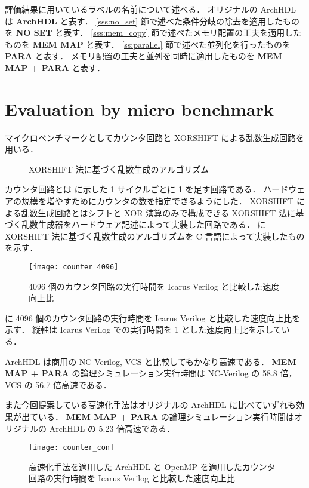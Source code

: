 評価結果に用いているラベルの名前について述べる．
オリジナルの ArchHDL は \textbf{ArchHDL} と表す．
\ref{sss:no_set} 節で述べた条件分岐の除去を適用したものを \textbf{NO SET} と表す．
\ref{sss:mem_copy} 節で述べたメモリ配置の工夫を適用したものを \textbf{MEM MAP} と表す．
\ref{ss:parallel} 節で述べた並列化を行ったものを \textbf{PARA} と表す．
メモリ配置の工夫と並列を同時に適用したものを \textbf{MEM MAP + PARA} と表す．


\section{Evaluation by micro benchmark}

マイクロベンチマークとしてカウンタ回路と XORSHIFT による乱数生成回路を用いる．

\begin{figure}[tb]
 
 \caption{XORSHIFT 法に基づく乱数生成のアルゴリズム}
 \label{src:xorshift_alg}
\end{figure}

カウンタ回路とは  に示した 1 サイクルごとに 1 を足す回路である．
ハードウェアの規模を増やすためにカウンタの数を指定できるようにした．
XORSHIFT による乱数生成回路とはシフトと XOR 演算のみで構成できる XORSHIFT 法に基づく乱数生成器をハードウェア記述によって実装した回路である．
 に XORSHIFT 法に基づく乱数生成のアルゴリズムを C 言語によって実装したものを示す．

\begin{figure}[tb]
 \centering
 \texttt{[image: counter\_4096]}
 \caption{4096 個のカウンタ回路の実行時間を Icarus Verilog と比較した速度向上比}
 \label{fig:counter4096}
\end{figure}

 に 4096 個のカウンタ回路の実行時間を Icarus Verilog と比較した速度向上比を示す．
縦軸は Icarus Verilog での実行時間を 1 とした速度向上比を示している．

ArchHDL は商用の NC-Verilog, VCS と比較してもかなり高速である．
\textbf{MEM MAP + PARA} の論理シミュレーション実行時間は NC-Verilog の 58.8 倍，VCS の 56.7 倍高速である．

また今回提案している高速化手法はオリジナルの ArchHDL に比べていずれも効果が出ている．
\textbf{MEM MAP + PARA} の論理シミュレーション実行時間はオリジナルの ArchHDL の 5.23 倍高速である．



\begin{figure}[tb]
 \centering
 \texttt{[image: counter\_con]}
 \caption{高速化手法を適用した ArchHDL と OpenMP を適用したカウンタ回路の実行時間を Icarus Verilog と比較した速度向上比}
 \label{fig:counter_con}
\end{figure}

